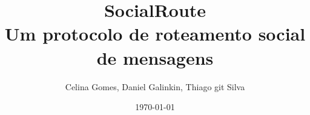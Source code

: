 \title[SocialRoute]
{\textbf{SocialRoute}
\\Um protocolo de roteamento social de mensagens}
\author[celina, dggc, thiagopes]{Celina Gomes, Daniel Galinkin, Thiago
git Silva}


\subject{Redes Complexas}

\date{\today}
\frame{\titlepage}
